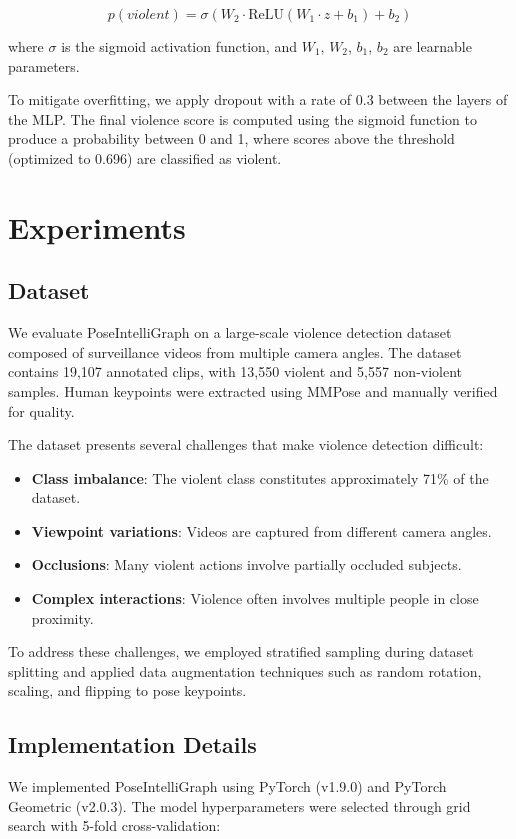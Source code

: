 \documentclass[conference]{IEEEtran}
\begin{document}
\begin{equation}
p(violent) = \sigma(W_2 \cdot \text{ReLU}(W_1 \cdot z + b_1) + b_2)
\end{equation}

where $\sigma$ is the sigmoid activation function, and $W_1$, $W_2$, $b_1$, $b_2$ are learnable parameters.

To mitigate overfitting, we apply dropout with a rate of 0.3 between the layers of the MLP. The final violence score is computed using the sigmoid function to produce a probability between 0 and 1, where scores above the threshold (optimized to 0.696) are classified as violent.

\section{Experiments}

\subsection{Dataset}
We evaluate PoseIntelliGraph on a large-scale violence detection dataset composed of surveillance videos from multiple camera angles. The dataset contains 19,107 annotated clips, with 13,550 violent and 5,557 non-violent samples. Human keypoints were extracted using MMPose and manually verified for quality.

The dataset presents several challenges that make violence detection difficult:
\begin{itemize}
    \item \textbf{Class imbalance}: The violent class constitutes approximately 71\% of the dataset.
    \item \textbf{Viewpoint variations}: Videos are captured from different camera angles.
    \item \textbf{Occlusions}: Many violent actions involve partially occluded subjects.
    \item \textbf{Complex interactions}: Violence often involves multiple people in close proximity.
\end{itemize}

To address these challenges, we employed stratified sampling during dataset splitting and applied data augmentation techniques such as random rotation, scaling, and flipping to pose keypoints.

\subsection{Implementation Details}
We implemented PoseIntelliGraph using PyTorch (v1.9.0) and PyTorch Geometric (v2.0.3). The model hyperparameters were selected through grid search with 5-fold cross-validation:
\end{document}

